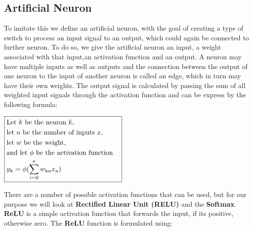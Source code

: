 \subsection{Artificial Neuron}
To imitate this we define an artificial neuron, with the goal of creating a type of switch to process an input signal
to an output, which could again be connected to further neuron.
To do so, we give the artificial neuron an input, a weight associated with that input,an activation function and an
output.
A neuron may have multiple inputs as well as outputs and the connection between the output of one neuron to the input
of another neuron is called an edge, which in turn may have their own weights.
The output signal is calculated by passing the sum of all weighted input signals through the activation function and
can be express by the following formula:
\newline
\begin{center}
    \begin{math}
        \boxed{
            \begin{aligned}
                &\textrm{Let } k\textrm{ be the neuron }k,&\\
                &\textrm{let } n \textrm{ be the number of inputs }x,&\\
                &\textrm{let } w \textrm{ be the weight,}&\\
                &\textrm{and let }\phi \textrm{ be the activation function}&\\
                &y\textsubscript{k} = \phi (\sum_{i=0}^n w\textsubscript{kn}x\textsubscript{n})
            \end{aligned}}
        \label{neuronactivation}
    \end{math}
\end{center}
There are a number of possible activation functions that can be used, but for our purpose we will look at
\textbf{Rectified Linear Unit (RELU)} and the \textbf{Softmax}.\\
\newline
\textbf{ReLU} is a simple activation function that forwards the input, if its positive, otherwise zero.
The \textbf{ReLU} function is formulated using:

